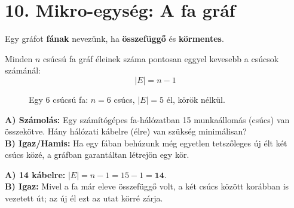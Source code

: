 \documentclass[a4paper,12pt]{article}
\begin{document}
\vspace{0.4cm}
\section{10. Mikro-egység: A fa gráf}

\begin{definiciodoboz}[Fa gráf]
Egy gráfot \textbf{fának} nevezünk, ha \textbf{összefüggő} és \textbf{körmentes}.
\end{definiciodoboz}

\begin{teteldoboz}
Minden $n$ csúcsú fa gráf éleinek száma pontosan eggyel kevesebb a csúcsok számánál:
\begin{equation}
    |E| = n - 1
\end{equation}
\end{teteldoboz}

\begin{figure}[H]
    \centering
    \caption{Egy 6 csúcsú fa: $n = 6$ csúcs, $|E| = 5$ él, körök nélkül.}
\end{figure}

\begin{feladatdoboz}
\textbf{A) Számolás:} Egy számítógépes fa-hálózatban 15 munkaállomás (csúcs) van összekötve. Hány hálózati kábelre (élre) van szükség minimálisan? \\
\textbf{B) Igaz/Hamis:} Ha egy fában behúzunk még egyetlen tetszőleges új élt két csúcs közé, a gráfban garantáltan létrejön egy kör.
\end{feladatdoboz}

\begin{megoldasdoboz}
\textbf{A) 14 kábelre:} $|E| = n - 1 = 15 - 1 = \mathbf{14}$. \\
\textbf{B) Igaz:} Mivel a fa már eleve összefüggő volt, a két csúcs között korábban is vezetett út; az új él ezt az utat körré zárja.
\end{megoldasdoboz}
\end{document}
